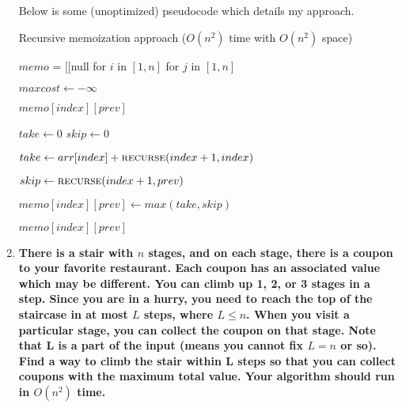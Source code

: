 \documentclass[12pt]{article}
\begin{document}
\begin{enumerate}
    Below is some (unoptimized) pseudocode which details my approach.
    
    \begin{algorithm}
        \caption{Recursive memoization approach ($O(n^2)$ time with $O(n^2)$ space)}
        \begin{algorithmic}
            \State $memo$ = [[null for $i$ in $[1, n]$ for $j$ in $[1, n]$
            
            \State $maxcost \gets -\infty$
            
            
                \State {}
            \EndIf
            
                \State \Return $memo[index][prev]$
            \EndIf
            
            \State $take \gets 0$
            \State $skip \gets 0$
            
                \State $take \gets arr[index] +  \Call{recurse}{index + 1, index}$
            \EndIf
            
            \State $skip \gets \Call{recurse}{index + 1, prev}$
            
            \State $memo[index][prev] \gets max(take, skip)$
            
            \State \Return $memo[index][prev]$
            
            \EndProcedure
        \end{algorithmic}
    \end{algorithm}
    
    \newpage

    \item \textbf{There is a stair with $n$ stages, and on each stage, there is a coupon to your favorite restaurant. 
    Each coupon has an associated value which may be different. You can climb up 1, 2, or 3 stages in a step. 
    Since you are in a hurry, you need to reach the top of the staircase in at most $L$ steps, where $L \leq n$. When you 
    visit a particular stage, you can collect the coupon on that stage. Note that L is a part of the input 
    (means you cannot fix $L = n$ or so). Find a way to climb the stair within L steps so that you can collect 
    coupons with the maximum total value. Your algorithm should run in $O(n^2)$ time.}


\end{enumerate}
\end{document}
